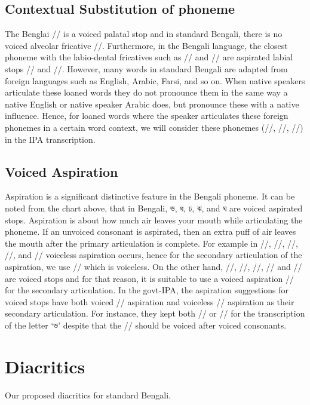 \subsection{Contextual Substitution of phoneme}
The Benglai // is a voiced palatal stop and in standard Bengali, there is no voiced alveolar fricative //. Furthermore, in the Bengali language, the closest phoneme with the labio-dental fricatives such as // and // are aspirated labial stops // and //. However, many words in standard Bengali are adapted from foreign languages such as English, Arabic, Farsi, and so on. When native speakers articulate these loaned words they do not pronounce them in the same way a native English or native speaker Arabic does, but pronounce these with a native influence. Hence, for loaned words where the speaker articulates these foreign phonemes in a certain word context, we will consider these phonemes (//, //, //) in the IPA transcription.

\subsection{Voiced Aspiration}
Aspiration is a significant distinctive feature in the Bengali phoneme. It can be noted from the chart above, that in Bengali, \textbengali{ভ, ধ, ঢ, ঝ,} and \textbengali{ঘ} are voiced aspirated stops. Aspiration is about how much air leaves your mouth while articulating the phoneme. If an unvoiced consonant is aspirated, then an extra puff of air leaves the mouth after the primary articulation is complete. For example in //, //, //, //, and // voiceless aspiration occurs, hence for the secondary articulation of the aspiration, we use // which is voiceless. On the other hand, //, //, //, // and // are voiced stops and for that reason, it is suitable to use a voiced aspiration // for the secondary articulation. 
In the govt-IPA, the aspiration suggestions for voiced stops have both voiced // aspiration and voiceless // aspiration as their secondary articulation. For instance, they kept both // or // for the transcription of the letter \textbengali{‘ভ’} despite that the // should be voiced after voiced consonants. 

\section{Diacritics}
Our proposed diacritics for standard Bengali.

